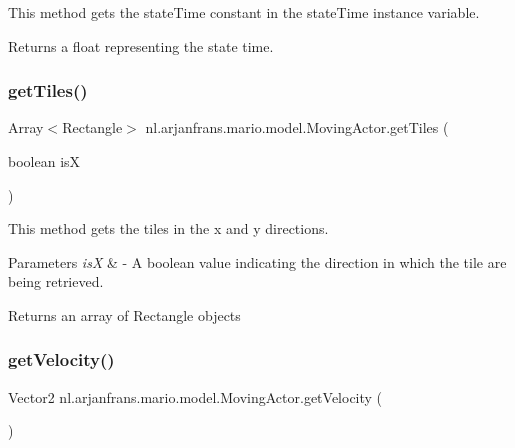 This method gets the state\+Time constant in the state\+Time instance variable. 

\begin{DoxyReturn}{Returns}
a float representing the state time. 
\end{DoxyReturn}
\mbox{\label{classnl_1_1arjanfrans_1_1mario_1_1model_1_1MovingActor_a1aaf050e3c58bc9c523ccc6cefeabaf4}} 
\subsubsection{\texorpdfstring{get\+Tiles()}{getTiles()}}
{\footnotesize\ttfamily Array$<$Rectangle$>$ nl.\+arjanfrans.\+mario.\+model.\+Moving\+Actor.\+get\+Tiles (\begin{DoxyParamCaption}\item[{boolean}]{isX }\end{DoxyParamCaption})\hspace{0.3cm}{\ttfamily [protected]}}



This method gets the tiles in the x and y directions. 


\begin{DoxyParams}{Parameters}
{\em isX} & -\/ A boolean value indicating the direction in which the tile are being retrieved. \\
\hline
\end{DoxyParams}
\begin{DoxyReturn}{Returns}
an array of Rectangle objects 
\end{DoxyReturn}
\mbox{\label{classnl_1_1arjanfrans_1_1mario_1_1model_1_1MovingActor_a0ab43947ad415abb6be30ede3695b712}} 
\subsubsection{\texorpdfstring{get\+Velocity()}{getVelocity()}}
{\footnotesize\ttfamily Vector2 nl.\+arjanfrans.\+mario.\+model.\+Moving\+Actor.\+get\+Velocity (\begin{DoxyParamCaption}{ }\end{DoxyParamCaption})}



